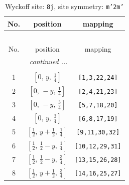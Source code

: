 \documentclass[fleqn,8pt]{jsarticle}
\begin{document}
\begin{longtable}{ccc}
\caption{Wyckoff site: {\tt 8j}, site symmetry: {\tt m'2m'}}
 \\
 \hline \hline
No. & position & mapping \\ \hline \endfirsthead

\multicolumn{2}{l}{\tablename\ \thetable{}} \\
 \hline \hline
No. & position & mapping \\ \hline \endhead

 \hline \hline
\multicolumn{2}{r}{\footnotesize\it continued ...} \\ \endfoot

 \hline \hline
\multicolumn{2}{r}{} \\ \endlastfoot

1 & $\left[ 0,\, y,\, \frac{1}{4} \right]$ & {\tt [1,3,22,24]} \\ \hline
2 & $\left[ 0,\, - y,\, \frac{1}{4} \right]$ & {\tt [2,4,21,23]} \\ \hline
3 & $\left[ 0,\, - y,\, \frac{3}{4} \right]$ & {\tt [5,7,18,20]} \\ \hline
4 & $\left[ 0,\, y,\, \frac{3}{4} \right]$ & {\tt [6,8,17,19]} \\ \hline
5 & $\left[ \frac{1}{2},\, y + \frac{1}{2},\, \frac{1}{4} \right]$ & {\tt [9,11,30,32]} \\ \hline
6 & $\left[ \frac{1}{2},\, \frac{1}{2} - y,\, \frac{1}{4} \right]$ & {\tt [10,12,29,31]} \\ \hline
7 & $\left[ \frac{1}{2},\, \frac{1}{2} - y,\, \frac{3}{4} \right]$ & {\tt [13,15,26,28]} \\ \hline
8 & $\left[ \frac{1}{2},\, y + \frac{1}{2},\, \frac{3}{4} \right]$ & {\tt [14,16,25,27]} \\
\end{longtable}
\renewcommand{\arraystretch}{1.2}
\end{document}
